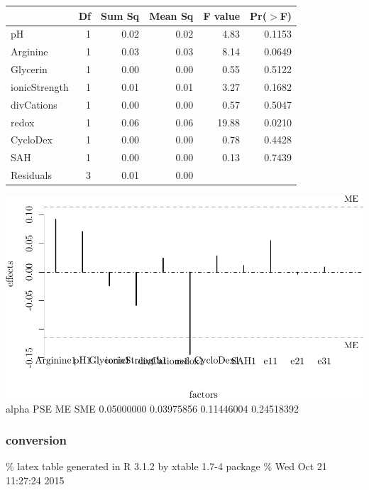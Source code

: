 \documentclass[]{article}
\begin{document}
\begin{table}[ht]
\centering
\begin{tabular}{lrrrrr}
  \hline
 & Df & Sum Sq & Mean Sq & F value & Pr($>$F) \\ 
  \hline
pH            & 1 & 0.02 & 0.02 & 4.83 & 0.1153 \\ 
  Arginine      & 1 & 0.03 & 0.03 & 8.14 & 0.0649 \\ 
  Glycerin      & 1 & 0.00 & 0.00 & 0.55 & 0.5122 \\ 
  ionicStrength & 1 & 0.01 & 0.01 & 3.27 & 0.1682 \\ 
  divCations    & 1 & 0.00 & 0.00 & 0.57 & 0.5047 \\ 
  redox         & 1 & 0.06 & 0.06 & 19.88 & 0.0210 \\ 
  CycloDex      & 1 & 0.00 & 0.00 & 0.78 & 0.4428 \\ 
  SAH           & 1 & 0.00 & 0.00 & 0.13 & 0.7439 \\ 
  Residuals     & 3 & 0.01 & 0.00 &  &  \\ 
   \hline
\end{tabular}
\end{table}

\includegraphics{analysis_files/figure-latex/unnamed-chunk-13-1.pdf}
alpha PSE ME SME 0.05000000 0.03975856 0.11446004 0.24518392

\subsubsection{conversion}\label{conversion-1}

\% latex table generated in R 3.1.2 by xtable 1.7-4 package \% Wed Oct
21 11:27:24 2015
\end{document}
